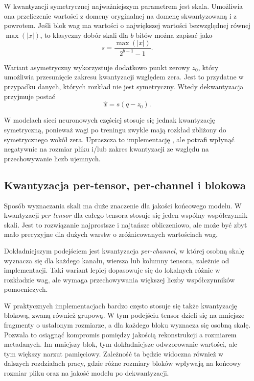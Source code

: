 W kwantyzacji symetrycznej najważniejszym parametrem jest skala. Umożliwia ona przeliczenie wartości z domeny oryginalnej na domenę skwantyzowaną i z powrotem. Jeśli blok wag ma wartości o największej wartości bezwzględnej równej $\max(|x|)$, to klasyczny dobór skali dla $b$ bitów można zapisać jako
\begin{equation}
	s = \frac{\max(|x|)}{2^{b-1}-1}.
\end{equation}

Wariant asymetryczny wykorzystuje dodatkowo punkt zerowy $z_0$, który umożliwia przesunięcie zakresu kwantyzacji względem zera. Jest to przydatne w przypadku danych, których rozkład nie jest symetryczny. Wtedy dekwantyzacja przyjmuje postać
\begin{equation}
	\hat{x} = s(q - z_0).
\end{equation}

W modelach sieci neuronowych częściej stosuje się jednak kwantyzację symetryczną, ponieważ wagi po treningu zwykle mają rozkład zbliżony do symetrycznego wokół zera. Upraszcza to implementację \cite{frantar2023gptq}, ale potrafi wpłynąć negatywnie na rozmiar pliku i/lub zakres kwantyzacji ze względu na przechowywanie liczb ujemnych.

\subsection{Kwantyzacja per-tensor, per-channel i blokowa}

Sposób wyznaczania skali ma duże znaczenie dla jakości końcowego modelu. W kwantyzacji \textit{per-tensor} dla całego tensora stosuje się jeden wspólny współczynnik skali. Jest to rozwiązanie najprostsze i najtańsze obliczeniowo, ale może być zbyt mało precyzyjne dla dużych warstw o zróżnicowanych wartościach wag.

Dokładniejszym podejściem jest kwantyzacja \textit{per-channel}, w której osobną skalę wyznacza się dla każdego kanału, wiersza lub kolumny tensora, zależnie od implementacji. Taki wariant lepiej dopasowuje się do lokalnych różnic w rozkładzie wag, ale wymaga przechowywania większej liczby współczynników pomocniczych.

W praktycznych implementacjach bardzo często stosuje się także kwantyzację blokową, zwaną również grupową. W tym podejściu tensor dzieli się na mniejsze fragmenty o ustalonym rozmiarze, a dla każdego bloku wyznacza się osobną skalę. Pozwala to osiągnąć kompromis pomiędzy jakością rekonstrukcji a rozmiarem metadanych. Im mniejszy blok, tym dokładniejsze odwzorowanie wartości, ale tym większy narzut pamięciowy. Zależność ta będzie widoczna również w dalszych rozdziałach pracy, gdzie różne rozmiary bloków wpływają na końcowy rozmiar pliku oraz na jakość modelu po dekwantyzacji.

